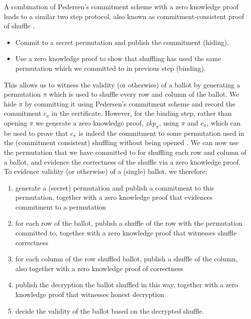\noindent
A combination of Pedersen's commitment scheme 
with a zero knowledge proof leads to a similar two step protocol, also known 
as commitment-consistent proof of shuffle \citep{Wikstrom:2009:CPS}.

\begin{itemize}
\item Commit to a secret permutation and publish the commitment (hiding).
\item Use a zero knowledge proof to show that shuffling has used 
      the same permutation which we committed to in previous step (binding).
\end{itemize}  

\noindent
This allows us to witness the validity (or otherwise) of a ballot by generating a 
permutation $\pi$ which is used to shuffle every row and column of the ballot.
We hide $\pi$ by committing it using Pedersen's 
commitment scheme 
and record the commitment $c_{\pi}$ in the certificate. However, for the binding step, rather 
than opening $\pi$ we generate a zero knowledge proof, $zkp_{\pi}$, 
using $\pi$ and $c_{\pi}$, which can 
be  used to prove that $c_{\pi}$ is indeed the commitment to some permutation
used in the (commitment consistent) shuffling 
 without being opened \citep{Wikstrom:2009:CPS}. We can now use the
 permutation that we have committed to for 
shuffling each row and column of a ballot, and evidence the
correctness of the shuffle via a zero knowledge proof.
%
To evidence validity (or otherwise) of a (single) ballot, we
therefore:
\begin{enumerate}
  \item generate a (secret) permutation and publish a commitment to this
  permutation, together with a zero knowledge proof that evidences commitment
  to a permutation
  \item for each row of the ballot, publish a shuffle of the row with
  the permutation committed to, together with a zero knowledge proof
  that witnesses shuffle correctness
  \item for each column of the row shuffled ballot, publish a
  shuffle of the column, also together with a zero knowledge proof of
  correctness 
  \item publish the decryption the ballot shuffled in this way, together with a
  zero knowledge proof that witnesses honest decryption
  \item decide the validity of the ballot based on the decrypted
  shuffle.
\end{enumerate}

